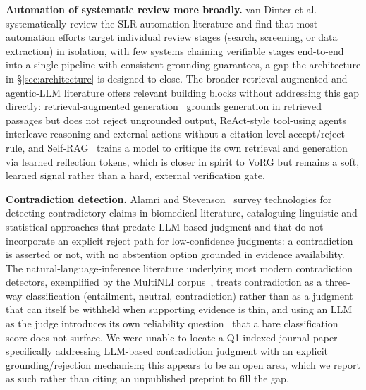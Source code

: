 \documentclass[11pt]{article}
\begin{document}
\textbf{Automation of systematic review more broadly.} van Dinter et al.~\cite{vandinter2021automation} systematically review the SLR-automation literature and find that most automation efforts target individual review stages (search, screening, or data extraction) in isolation, with few systems chaining verifiable stages end-to-end into a single pipeline with consistent grounding guarantees, a gap the architecture in \S\ref{sec:architecture} is designed to close. The broader retrieval-augmented and agentic-LLM literature offers relevant building blocks without addressing this gap directly: retrieval-augmented generation~\cite{lewis2020retrieval} grounds generation in retrieved passages but does not reject ungrounded output, ReAct-style tool-using agents~\cite{yao2023react} interleave reasoning and external actions without a citation-level accept/reject rule, and Self-RAG~\cite{asai2024selfrag} trains a model to critique its own retrieval and generation via learned reflection tokens, which is closer in spirit to VoRG but remains a soft, learned signal rather than a hard, external verification gate.

\textbf{Contradiction detection.} Alamri and Stevenson~\cite{alamri2016contradiction} survey technologies for detecting contradictory claims in biomedical literature, cataloguing linguistic and statistical approaches that predate LLM-based judgment and that do not incorporate an explicit reject path for low-confidence judgments: a contradiction is asserted or not, with no abstention option grounded in evidence availability. The natural-language-inference literature underlying most modern contradiction detectors, exemplified by the MultiNLI corpus~\cite{williams2018broad}, treats contradiction as a three-way classification (entailment, neutral, contradiction) rather than as a judgment that can itself be withheld when supporting evidence is thin, and using an LLM as the judge introduces its own reliability question~\cite{zheng2023judging} that a bare classification score does not surface. We were unable to locate a Q1-indexed journal paper specifically addressing LLM-based contradiction judgment with an explicit grounding/rejection mechanism; this appears to be an open area, which we report as such rather than citing an unpublished preprint to fill the gap.
\end{document}
